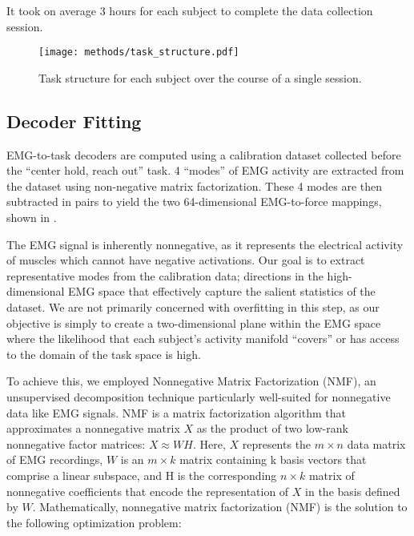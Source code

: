 \documentclass[../main.tex]{subfiles}
\begin{document}
%
It took on average 3 hours for each subject to complete the data collection session.

\begin{figure}[!htb]
  \centering
  \texttt{[image: methods/task\_structure.pdf]}
  \caption[Task structure for each subject]{Task structure for each subject over the course of a single session.}\label{fig:task_structure}
\end{figure}
  






\subsection{Decoder Fitting}\label{sec:decoder_fitting}

EMG-to-task decoders are computed using a calibration dataset collected before the ``center hold, reach out'' task. 4 ``modes'' of EMG activity are extracted from the dataset using non-negative matrix factorization. These 4 modes are then subtracted in pairs to yield the two 64-dimensional EMG-to-force mappings, shown in . 

The EMG signal is inherently nonnegative, as it represents the electrical activity of muscles which cannot have negative activations. Our goal is to extract representative modes from the calibration data; directions in the high-dimensional EMG space that effectively capture the salient statistics of the dataset. We are not primarily concerned with overfitting in this step, as our objective is simply to create a two-dimensional plane within the EMG space where the likelihood that each subject's activity manifold ``covers'' or has access to the domain of the task space is high.

To achieve this, we employed Nonnegative Matrix Factorization (NMF), an unsupervised decomposition technique particularly well-suited for nonnegative data like EMG signals. NMF is a matrix factorization algorithm that approximates a nonnegative matrix $X$ as the product of two low-rank nonnegative factor matrices: $X\approx WH$. Here, $X$ represents the $m\times{n}$ data matrix of EMG recordings, $W$ is an $m\times{k}$ matrix containing k basis vectors that comprise a linear subspace, and H is the corresponding $n\times{k}$ matrix of nonnegative coefficients that encode the representation of $X$ in the basis defined by $W$. Mathematically, nonnegative matrix factorization (NMF) is the solution to the following optimization problem:
\end{document}
